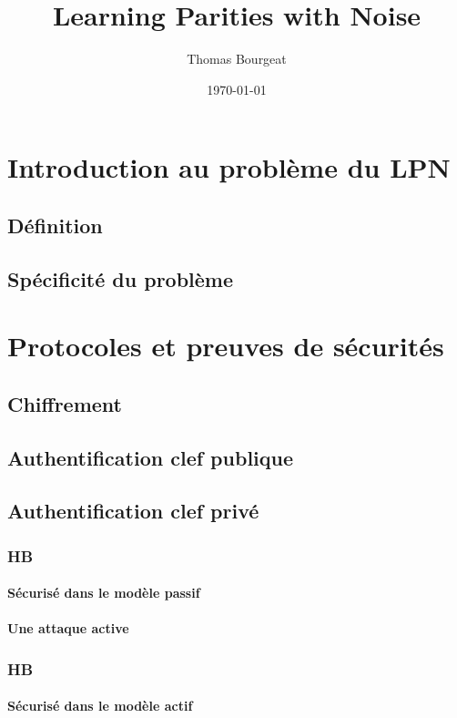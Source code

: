 \documentclass{article}		%
\begin{document}
\title{Learning Parities with Noise}
\author{Thomas Bourgeat }
\date\today
\maketitle
\section{Introduction au problème du LPN}

\subsection{Définition}
\subsection{Spécificité du problème}
\cite{Dam}

\section{Protocoles et preuves de sécurités}
\subsection{Chiffrement}
\subsection{Authentification clef publique}
\subsection{Authentification clef privé}
\subsubsection{HB}
\paragraph{Sécurisé dans le modèle passif}
\paragraph{Une attaque active}
\subsubsection{HB\sharp}
\paragraph{Sécurisé dans le modèle actif}
\end{document}
